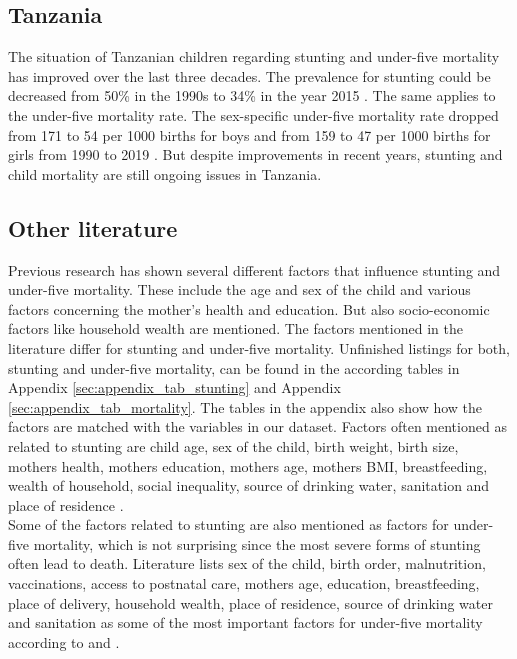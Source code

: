 \documentclass[a4paper, 11pt]{article} %
\begin{document}
\subsection*{Tanzania}
The situation of Tanzanian children regarding stunting and under-five mortality has improved over the last three decades. The prevalence for stunting could be decreased from 50\% in the 1990s to 34\% in the year 2015 \cite{UNI18}. The same applies to the under-five mortality rate. The sex-specific under-five mortality rate dropped from 171 to 54 per 1000 births for boys and from 159 to 47 per 1000 births for girls from 1990 to 2019 \cite{UN20}. But despite improvements in recent years, stunting and child mortality are still ongoing issues in  Tanzania. 


\subsection*{Other literature}
Previous research has shown several different factors that influence stunting and under-five mortality. These include the age and sex of the child and various factors concerning the mother's health and education. But also socio-economic factors like household wealth are mentioned. The factors mentioned in the literature differ for stunting and under-five mortality. Unfinished listings for both, stunting and under-five mortality, can be found in the according tables in Appendix \ref{sec:appendix_tab_stunting} and Appendix \ref{sec:appendix_tab_mortality}. The tables in the appendix also show how the factors are matched with the variables in our dataset. Factors often mentioned as related to stunting are child age, sex of the child, birth weight, birth size, mothers health, mothers education, mothers age, mothers BMI, breastfeeding, wealth of household, social inequality, source of drinking water, sanitation and place of residence \cite{Akombi2017Aug}\cite{UNI18}. \\

Some of the factors related to stunting are also mentioned as factors for under-five mortality, which is not surprising since the most severe forms of stunting often lead to death. Literature lists sex of the child, birth order, malnutrition, vaccinations, access to postnatal care, mothers age, education, breastfeeding, place of delivery, household wealth, place of residence, source of drinking water and sanitation as some of the most important factors for under-five mortality according to \cite{Ettarh2012Mar}\cite{Who2020Sep} and \cite{UNICEF2006}. 
\end{document}
